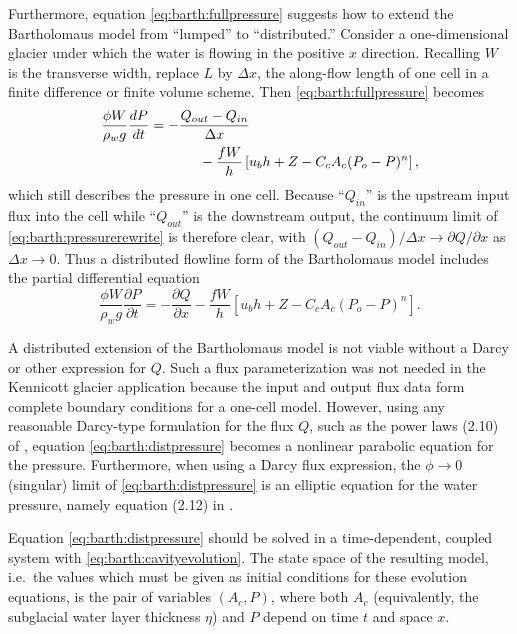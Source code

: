 \documentclass[twocolumn,letterpaper]{igs}
\begin{document}
Furthermore, equation \eqref{eq:barth:fullpressure} suggests how to extend the Bartholomaus model from ``lumped'' to ``distributed.''  Consider a one-dimensional glacier under which the water is flowing in the positive $x$ direction.  Recalling $W$ is the transverse width, replace $L$ by $\Delta x$, the along-flow length of one cell in a finite difference or finite volume scheme.  Then \eqref{eq:barth:fullpressure} becomes
\begin{align}
&\frac{\phi W}{\rho_w g}\frac{dP}{dt} = - \frac{Q_{out} - Q_{in}}{\Delta x}  \label{eq:barth:pressurerewrite} \\
&\qquad \qquad \qquad \quad - \frac{f W}{h} \left[u_b h + Z - C_c A_c (P_o-P)^n\right], \notag
\end{align}
which still describes the pressure in one cell.  Because ``$Q_{in}$'' is the upstream input flux into the cell while ``$Q_{out}$'' is the downstream output, the continuum limit of \eqref{eq:barth:pressurerewrite} is therefore clear, with $(Q_{out} - Q_{in})/\Delta x \to \partial Q/\partial x$ as $\Delta x \to 0$.  Thus a distributed flowline form of the Bartholomaus model includes the partial differential equation
\begin{equation}
\frac{\phi W}{\rho_w g} \frac{\partial P}{\partial t} = - \frac{\partial Q}{\partial x} - \frac{f W}{h} \left[u_b h + Z - C_c A_c (P_o-P)^n\right]. \label{eq:barth:distpressure}
\end{equation}

A distributed extension of the Bartholomaus model is not viable without a Darcy or other expression for $Q$.  Such a flux parameterization was not needed in the Kennicott glacier application because the input and output flux data form complete boundary conditions for a one-cell model.  However, using any reasonable Darcy-type formulation for the flux $Q$, such as the power laws (2.10) of \cite{Schoofetal2012}, equation \eqref{eq:barth:distpressure} becomes a nonlinear parabolic equation for the pressure.  Furthermore, when using a Darcy flux expression, the $\phi\to 0$ (singular) limit of \eqref{eq:barth:distpressure} is an elliptic equation for the water pressure, namely equation (2.12) in \cite{Schoofetal2012}.

Equation \eqref{eq:barth:distpressure} should be solved in a time-dependent, coupled system with \eqref{eq:barth:cavityevolution}.  The state space of the resulting model, i.e.~the values which must be given as initial conditions for these evolution equations, is the pair of variables $(A_c,P)$, where both $A_c$ (equivalently, the subglacial water layer thickness $\eta$) and $P$ depend on time $t$ and space $x$.
\end{document}
